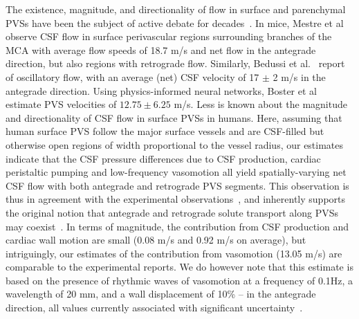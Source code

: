 \documentclass[fleqn,10pt]{wlscirep}
\begin{document}
The existence, magnitude, and directionality of flow in surface and
parenchymal PVSs have been the subject of active debate for
decades~\cite{rennels1985evidence, bilston2003arterial,
  hadaczek2006perivascular, carare2008solutes, iliff2012paravascular,
  iliff2013cerebral, bakker2016lymphatic, mestre2018flow,
  bedussi2018paravascular, rey2018pulsatile, thomas2019fluid,
  daversin2020mechanisms, kedarasetti2020functional,
  martinac2021phase, vanveluw2020vasomotion, bohr2022glymphatic,
  boster2023artificial, gjerde2023directional,
  nozaleda2024arterial}. In mice, Mestre et al~\cite{mestre2018flow}
observe CSF flow in surface perivascular regions surrounding branches
of the MCA with average flow speeds of 18.7 \textmu m/s and net flow
in the antegrade direction, but also regions with retrograde
flow. Similarly, Bedussi et al.~\cite{bedussi2018paravascular} report
of oscillatory flow, with an average (net) CSF velocity of 17 $\pm$ 2
\textmu m/s in the antegrade direction. Using physics-informed neural
networks, Boster et al~\cite{boster2023artificial} estimate PVS
velocities of $12.75 \pm 6.25$ \textmu m/s. Less is known about the
magnitude and directionality of CSF flow in surface PVSs in
humans. Here, assuming that human surface PVS follow the major surface
vessels and are CSF-filled but otherwise open regions of width
proportional to the vessel radius, our estimates indicate that the CSF
pressure differences due to CSF production, cardiac peristaltic
pumping and low-frequency vasomotion all yield spatially-varying net
CSF flow with both antegrade and retrograde PVS segments. This
observation is thus in agreement with the experimental
observations~\cite{mestre2018flow, bedussi2018paravascular}, and
inherently supports the original notion that antegrade and retrograde
solute transport along PVSs may coexist~\cite{rennels1985evidence}. In
terms of magnitude, the contribution from CSF production and cardiac
wall motion are small (0.08 \textmu m/s and 0.92 \textmu m/s on
average), but intriguingly, our estimates of the contribution from
vasomotion (13.05 \textmu m/s) are comparable to the experimental
reports. We do however note that this estimate is based on the
presence of rhythmic waves of vasomotion at a frequency of 0.1Hz, a
wavelength of 20 mm, and a wall displacement of 10\% -- in the
antegrade direction, all values currently associated with significant
uncertainty~\cite{gokina1996electrical, vanveluw2020vasomotion,
  broggini2024long}.
\end{document}

